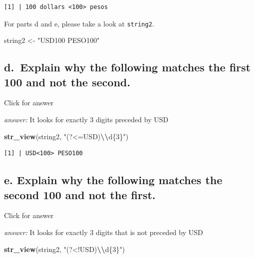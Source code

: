 \documentclass[
]{book}
\newenvironment{Shaded}{\begin{snugshade}}{\end{snugshade}}
\newcommand{\FunctionTok}[1]{\textcolor[rgb]{0.13,0.29,0.53}{\textbf{#1}}}
\newcommand{\NormalTok}[1]{#1}
\newcommand{\OtherTok}[1]{\textcolor[rgb]{0.56,0.35,0.01}{#1}}
\newcommand{\SpecialCharTok}[1]{\textcolor[rgb]{0.81,0.36,0.00}{\textbf{#1}}}
\newcommand{\StringTok}[1]{\textcolor[rgb]{0.31,0.60,0.02}{#1}}
\begin{document}
\begin{verbatim}
[1] | 100 dollars <100> pesos
\end{verbatim}

For parts d and e, please take a look at \texttt{string2}.

\begin{Shaded}
\begin{Highlighting}[]
\NormalTok{string2 }\OtherTok{\textless{}{-}} \StringTok{"USD100 PESO100"}
\end{Highlighting}
\end{Shaded}

\hypertarget{d.-explain-why-the-following-matches-the-first-100-and-not-the-second.}{%
\subsection{d.~Explain why the following matches the first 100 and not the second.}\label{d.-explain-why-the-following-matches-the-first-100-and-not-the-second.}}

Click for answer

\emph{answer:} It looks for exactly 3 digits preceded by USD

\begin{Shaded}
\begin{Highlighting}[]
\FunctionTok{str\_view}\NormalTok{(string2, }\StringTok{"(?\textless{}=USD)}\SpecialCharTok{\textbackslash{}\textbackslash{}}\StringTok{d\{3\}"}\NormalTok{)}
\end{Highlighting}
\end{Shaded}

\begin{verbatim}
[1] | USD<100> PESO100
\end{verbatim}

\hypertarget{e.-explain-why-the-following-matches-the-second-100-and-not-the-first.}{%
\subsection{e. Explain why the following matches the second 100 and not the first.}\label{e.-explain-why-the-following-matches-the-second-100-and-not-the-first.}}

Click for answer

\emph{answer:} It looks for exactly 3 digits that is not preceded by USD

\begin{Shaded}
\begin{Highlighting}[]
\FunctionTok{str\_view}\NormalTok{(string2, }\StringTok{"(?\textless{}!USD)}\SpecialCharTok{\textbackslash{}\textbackslash{}}\StringTok{d\{3\}"}\NormalTok{)}
\end{Highlighting}
\end{Shaded}
\end{document}
